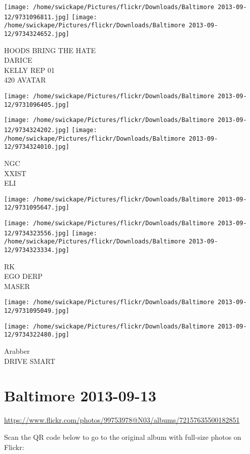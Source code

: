 \documentclass[10pt,letterpaper]{article}
\begin{document}
\texttt{[image: /home/swickape/Pictures/flickr/Downloads/Baltimore 2013-09-12/9731096811.jpg]}
\texttt{[image: /home/swickape/Pictures/flickr/Downloads/Baltimore 2013-09-12/9734324652.jpg]}

HOODS BRING THE HATE\\
DARICE\\
KELLY REP 01\\
420 AVATAR
\pagebreak

\texttt{[image: /home/swickape/Pictures/flickr/Downloads/Baltimore 2013-09-12/9731096405.jpg]}

\vspace{0.25in}
\texttt{[image: /home/swickape/Pictures/flickr/Downloads/Baltimore 2013-09-12/9734324202.jpg]}
\texttt{[image: /home/swickape/Pictures/flickr/Downloads/Baltimore 2013-09-12/9734324010.jpg]}

NGC\\
XXIST\\
ELI
\pagebreak

\texttt{[image: /home/swickape/Pictures/flickr/Downloads/Baltimore 2013-09-12/9731095647.jpg]}

\vspace{0.25in}
\texttt{[image: /home/swickape/Pictures/flickr/Downloads/Baltimore 2013-09-12/9734323556.jpg]}
\texttt{[image: /home/swickape/Pictures/flickr/Downloads/Baltimore 2013-09-12/9734323334.jpg]}

RK\\
EGO DERP\\
MASER
\pagebreak

\texttt{[image: /home/swickape/Pictures/flickr/Downloads/Baltimore 2013-09-12/9731095049.jpg]}

\vspace{0.25in}
\texttt{[image: /home/swickape/Pictures/flickr/Downloads/Baltimore 2013-09-12/9734322480.jpg]}

Arabber\\
DRIVE SMART
\pagebreak

\section*{Baltimore 2013-09-13}

\url{https://www.flickr.com/photos/99753978@N03/albums/72157635500182851}

Scan the QR code below to go to the original album with full-size photos on Flickr:
\end{document}
